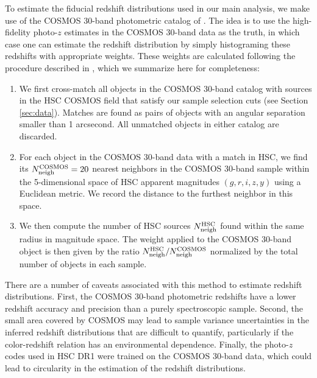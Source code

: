 \documentclass[a4paper,11pt]{article}
\begin{document}
    To estimate the fiducial redshift distributions used in our main analysis, we make use of the COSMOS 30-band photometric catalog of \cite{2016ApJS..224...24L}. The idea is to use the high-fidelity photo-$z$ estimates in the COSMOS 30-band data as the truth, in which case one can estimate the redshift distribution by simply histograming these redshifts with appropriate weights. These weights are calculated following the procedure described in \cite{2017MNRAS.465.1454H,2019PASJ...71...43H}, which we summarize here for completeness:
    \begin{enumerate}
      \item We first cross-match all objects in the COSMOS 30-band catalog with sources in the HSC COSMOS field that satisfy our sample selection cuts (see Section \ref{sec:data}). Matches are found as pairs of objects with an angular separation smaller than 1 arcsecond. All unmatched objects in either catalog are discarded.
      \item For each object in the COSMOS 30-band data with a match in HSC, we find its $N_{\rm neigh}^{\rm COSMOS}=20$ nearest neighbors in the COSMOS 30-band sample within the 5-dimensional space of HSC apparent magnitudes $(g,r,i,z,y)$ using a Euclidean metric. We record the distance to the furthest neighbor in this space.
      \item We then compute the number of HSC sources $N_{\rm neigh}^{\rm HSC}$ found within the same radius in magnitude space. The weight applied to the COSMOS 30-band object is then given by the ratio $N^{\rm HSC}_{\rm neigh}/N^{\rm COSMOS}_{\rm neigh}$ normalized by the total number of objects in each sample.
    \end{enumerate}
    There are a number of caveats associated with this method to estimate redshift distributions. First, the COSMOS 30-band photometric redshifts have a lower redshift accuracy and precision than a purely spectroscopic sample. Second, the small area covered by COSMOS may lead to sample variance uncertainties in the inferred redshift distributions that are difficult to quantify, particularly if the color-redshift relation has an environmental dependence. Finally, the photo-$z$ codes used in HSC DR1 were trained on the COSMOS 30-band data, which could lead to circularity in the estimation of the redshift distributions.
    
\end{document}
